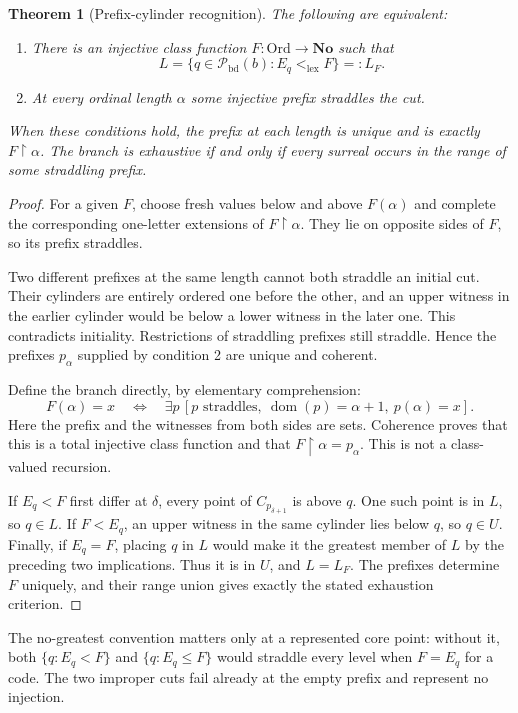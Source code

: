 \documentclass[11pt]{article}
\newtheorem{theorem}{Theorem}[section]
\theoremstyle{definition}
\theoremstyle{remark}
\newcommand{\No}{\mathbf{No}}
\newcommand{\Ord}{\mathrm{Ord}}
\newcommand{\Pbd}{\mathcal P_{\mathrm{bd}}}
\newcommand{\lex}{\mathrm{lex}}
\newcommand{\dom}{\operatorname{dom}}
\newcommand{\res}{\mathbin{\upharpoonright}}
\begin{document}
\begin{theorem}[Prefix-cylinder recognition]\label{swo:ds:thm:cutrecognition}
The following are equivalent:
\begin{enumerate}
\item There is an injective class function $F:\Ord\to\No$ such that
\[
 L=\{q\in \Pbd(b):E_q<_{\lex}F\}=:L_F.
\]
\item At every ordinal length $\alpha$ some injective prefix straddles
the cut.
\end{enumerate}
When these conditions hold, the prefix at each length is unique and is
exactly $F\res\alpha$. The branch is exhaustive if and only if every
surreal occurs in the range of some straddling prefix.
\end{theorem}
\begin{proof}
For a given $F$, choose fresh values below and above $F(\alpha)$ and
complete the corresponding one-letter extensions of $F\res\alpha$.
They lie on opposite sides of $F$, so its prefix straddles.

Two different prefixes at the same length cannot both straddle an
initial cut. Their cylinders are entirely ordered one before the
other, and an upper witness in the earlier cylinder would be below a
lower witness in the later one. This contradicts initiality.
Restrictions of straddling prefixes still straddle. Hence the prefixes
$p_\alpha$ supplied by condition 2 are unique and coherent.

Define the branch directly, by elementary comprehension:
\[
 F(\alpha)=x\quad\Longleftrightarrow\quad
 \exists p\,[p\text{ straddles},\ \dom(p)=\alpha+1,\ p(\alpha)=x].
\tag{S16.14}\label{swo:ds:eq:recognitionformula}
\]
Here the prefix and the witnesses from both sides are sets. Coherence
proves that this is a total injective class function and that
$F\res\alpha=p_\alpha$. This is not a class-valued recursion.

If $E_q<F$ first differ at $\delta$, every point of
$C_{p_{\delta+1}}$ is above $q$. One such point is in $L$, so $q\in L$.
If $F<E_q$, an upper witness in the same cylinder lies below $q$, so
$q\in U$. Finally, if $E_q=F$, placing $q$ in $L$ would make it the
greatest member of $L$ by the preceding two implications. Thus it is
in $U$, and $L=L_F$. The prefixes determine $F$ uniquely, and their
range union gives exactly the stated exhaustion criterion.
\end{proof}

The no-greatest convention matters only at a represented core point:
without it, both $\{q:E_q<F\}$ and $\{q:E_q\le F\}$ would straddle
every level when $F=E_q$ for a code. The two improper cuts fail already
at the empty prefix and represent no injection.
\end{document}
